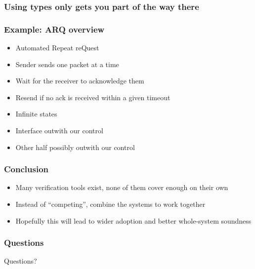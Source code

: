 \documentclass[compress]{beamer}
\begin{document}
\begin{frame}
  \frametitle{Using types only gets you part of the way there}
  

\end{frame}

\begin{frame}
  \frametitle{Example: ARQ {\textendash} overview}


  \begin{itemize}
    \item Automated Repeat reQuest {\textcolor{white}{(of course -\_-)}}
    \item Sender sends one packet at a time
    \item Wait for the receiver to acknowledge them
    \item Resend if no ack is received within a given timeout
  \end{itemize}

  \begin{itemize}
    \item Infinite states
    \item Interface outwith our control
    \item Other half possibly outwith our control
  \end{itemize}

\end{frame}

\begin{frame}
  \frametitle{Conclusion}

  \begin{itemize}
    \item Many verification tools exist, none of them cover enough on their own
    \item Instead of ``competing'', combine the systems to work together
    \item Hopefully this will lead to wider adoption and better whole-system
          soundness
  \end{itemize}

\end{frame}

\begin{frame}
  \frametitle{Questions}

  \begin{center}
    \begin{alertblock}{Questions?}
    \end{alertblock}
  \end{center}

\end{frame}
\end{document}
